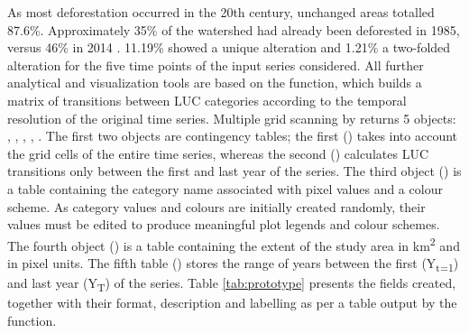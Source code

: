 As most deforestation occurred in the 20th century, unchanged areas
totalled 87.6\%. Approximately 35\% of the watershed had already been
deforested in 1985, versus 46\% in 2014 \citep{Mapbiomas}. 11.19\%
showed a unique alteration and 1.21\% a two-folded alteration for the
five time points of the input series considered. All further analytical
and visualization tools are based on the  function,
which builds a matrix of transitions between LUC categories according to
the temporal resolution of the original time series. Multiple grid
scanning by  returns 5 objects: ,
, , , . The first two
objects are contingency tables; the first () takes into
account the grid cells of the entire time series, whereas the second
() calculates LUC transitions only between the first and
last year of the series. The third object () is a table
containing the category name associated with pixel values and a colour
scheme. As category values and colours are initially created randomly,
their values must be edited to produce meaningful plot legends and
colour schemes. The fourth object () is a table containing the
extent of the study area in km\textsuperscript{2} and in pixel units.
The fifth table () stores the range of years between the
first (Y\textsubscript{t=1}) and last year (Y\textsubscript{T}) of the
series. Table \ref{tab:prototype} presents the fields created, together
with their format, description and labelling as per a table output by
the  function.

